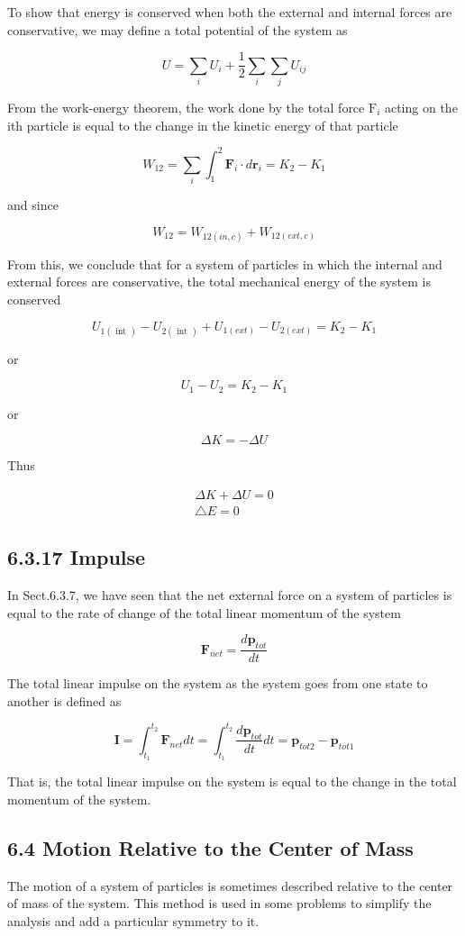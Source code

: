 \documentclass[10pt]{article}
\begin{document}
To show that energy is conserved when both the external and internal forces are conservative, we may define a total potential of the system as

$$
U=\sum_{i} U_{i}+\frac{1}{2} \sum_{i} \sum_{j} U_{i j}
$$

From the work-energy theorem, the work done by the total force $\mathrm{F}_{i}$ acting on the ith particle is equal to the change in the kinetic energy of that particle

$$
W_{12}=\sum_{i} \int_{1}^{2} \mathbf{F}_{i} \cdot d \mathbf{r}_{i}=K_{2}-K_{1}
$$

and since

$$
W_{12}=W_{12(i n, c)}+W_{12(e x t, c)}
$$

From this, we conclude that for a system of particles in which the internal and external forces are conservative, the total mechanical energy of the system is conserved

$$
U_{1(\text { int })}-U_{2(\text { int })}+U_{1(e x t)}-U_{2(e x t)}=K_{2}-K_{1}
$$

or

$$
U_{1}-U_{2}=K_{2}-K_{1}
$$

or

$$
\Delta K=-\Delta U
$$

Thus

$$
\begin{gathered}
\Delta K+\Delta U=0 \\
\triangle E=0
\end{gathered}
$$

\subsection*{6.3.17 Impulse}
In Sect.6.3.7, we have seen that the net external force on a system of particles is equal to the rate of change of the total linear momentum of the system

$$
\mathbf{F}_{n e t}=\frac{d \mathbf{p}_{t o t}}{d t}
$$

The total linear impulse on the system as the system goes from one state to another is defined as

$$
\mathbf{I}=\int_{t_{1}}^{t_{2}} \mathbf{F}_{n e t} d t=\int_{t_{1}}^{t_{2}} \frac{d \mathbf{p}_{t o t}}{d t} d t=\mathbf{p}_{t o t 2}-\mathbf{p}_{t o t 1}
$$

That is, the total linear impulse on the system is equal to the change in the total momentum of the system.

\subsection*{6.4 Motion Relative to the Center of Mass}
The motion of a system of particles is sometimes described relative to the center of mass of the system. This method is used in some problems to simplify the analysis and add a particular symmetry to it.
\end{document}
